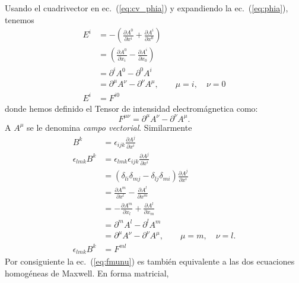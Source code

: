 Usando el cuadrivector en ec.~(\ref{eq:cv_phia}) y
expandiendo la ec.~(\ref{eq:phia}), tenemos
\begin{align}
  E^i&=-(\frac{\partial A^0}{\partial x^{i}}+\frac{\partial A^{i}}{\partial x^0})\nonumber\\
  &=(\frac{\partial A^0}{\partial x_i}-\frac{\partial A^{i}}{\partial x_0})\nonumber\\
  &=\partial^{i}A^0-\partial^0 A^{i}\nonumber\\
  \label{eq:Efmunu}
  &=\partial^\mu A^\nu-\partial^\nu A^\mu,
  \qquad 
  \mu=i,\quad \nu=0\\
  \label{eq:E_Fi0} %
  E^{i}&=F^{i0}
\end{align}
donde hemos definido el Tensor de intensidad electrom\'agnetica como:
\begin{equation}
  \label{eq:fmunu}
    F^{\mu\nu}=\partial^\mu A^\nu-\partial^\nu A^\mu.
\end{equation}
A $A^\mu$ se le denomina \emph{campo vectorial}. Similarmente
\begin{align}
  B^k&=\epsilon_{ijk}\frac{\partial A^j}{\partial x^{i}}\nonumber\\
  \epsilon_{lmk}B^k&=\epsilon_{lmk}\epsilon_{ijk}\frac{\partial A^j}{\partial x^{i}}\nonumber\\
  &=(\delta_{li}\delta_{mj}-\delta_{lj}\delta_{mi})\frac{\partial A^j}{\partial x^{i}}\nonumber\\
  &=\frac{\partial A^m}{\partial x^l}-\frac{\partial A^l}{\partial x^m}\nonumber\\
  &=-\frac{\partial A^m}{\partial x_l}+\frac{\partial A^l}{\partial x_m}\nonumber\\
  &=\partial^m A^l-\partial^l A^m\nonumber\\
  \label{eq:Bfmunu}
  &=\partial^\mu A^\nu-\partial^\nu A^\mu,
  \qquad 
  \mu=m,\quad \nu=l.\\
  \label{eq:BFij}
\epsilon_{lmk}B^k&=F^{ml}
\end{align}
Por consiguiente la ec.~(\ref{eq:fmunu}) es tambi\'en equivalente a las
dos ecuaciones homog\'eneas de Maxwell. En forma matricial,
